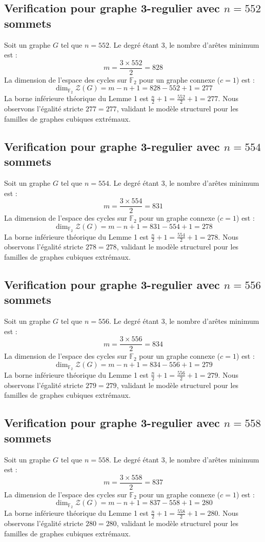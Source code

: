 \documentclass[11pt,a4paper]{article}
\begin{document}
\subsection{Verification pour graphe 3-regulier avec $n=552$ sommets}
Soit un graphe $G$ tel que $n = 552$. Le degré étant 3, le nombre d'arêtes minimum est :
$$ m = \frac{3 \times 552}{2} = 828 $$
La dimension de l'espace des cycles sur $\mathbb{F}_2$ pour un graphe connexe ($c=1$) est :
$$ \dim_{\mathbb{F}_2} \mathcal{Z}(G) = m - n + 1 = 828 - 552 + 1 = 277 $$
La borne inférieure théorique du Lemme 1 est $\frac{n}{2} + 1 = \frac{552}{2} + 1 = 277$.
Nous observons l'égalité stricte $277 = 277$, validant le modèle structurel pour les familles de graphes cubiques extrémaux.

\subsection{Verification pour graphe 3-regulier avec $n=554$ sommets}
Soit un graphe $G$ tel que $n = 554$. Le degré étant 3, le nombre d'arêtes minimum est :
$$ m = \frac{3 \times 554}{2} = 831 $$
La dimension de l'espace des cycles sur $\mathbb{F}_2$ pour un graphe connexe ($c=1$) est :
$$ \dim_{\mathbb{F}_2} \mathcal{Z}(G) = m - n + 1 = 831 - 554 + 1 = 278 $$
La borne inférieure théorique du Lemme 1 est $\frac{n}{2} + 1 = \frac{554}{2} + 1 = 278$.
Nous observons l'égalité stricte $278 = 278$, validant le modèle structurel pour les familles de graphes cubiques extrémaux.

\subsection{Verification pour graphe 3-regulier avec $n=556$ sommets}
Soit un graphe $G$ tel que $n = 556$. Le degré étant 3, le nombre d'arêtes minimum est :
$$ m = \frac{3 \times 556}{2} = 834 $$
La dimension de l'espace des cycles sur $\mathbb{F}_2$ pour un graphe connexe ($c=1$) est :
$$ \dim_{\mathbb{F}_2} \mathcal{Z}(G) = m - n + 1 = 834 - 556 + 1 = 279 $$
La borne inférieure théorique du Lemme 1 est $\frac{n}{2} + 1 = \frac{556}{2} + 1 = 279$.
Nous observons l'égalité stricte $279 = 279$, validant le modèle structurel pour les familles de graphes cubiques extrémaux.

\subsection{Verification pour graphe 3-regulier avec $n=558$ sommets}
Soit un graphe $G$ tel que $n = 558$. Le degré étant 3, le nombre d'arêtes minimum est :
$$ m = \frac{3 \times 558}{2} = 837 $$
La dimension de l'espace des cycles sur $\mathbb{F}_2$ pour un graphe connexe ($c=1$) est :
$$ \dim_{\mathbb{F}_2} \mathcal{Z}(G) = m - n + 1 = 837 - 558 + 1 = 280 $$
La borne inférieure théorique du Lemme 1 est $\frac{n}{2} + 1 = \frac{558}{2} + 1 = 280$.
Nous observons l'égalité stricte $280 = 280$, validant le modèle structurel pour les familles de graphes cubiques extrémaux.
\end{document}
